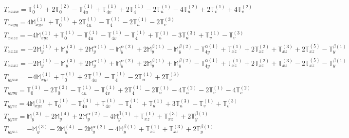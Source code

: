 \documentclass[fleqn,8pt,landscape]{jsarticle}
\begin{document}
\begin{align*}
& T_{xxxx} = \mathbb{T}_{0}^{(1)} + 2 \mathbb{T}_{0}^{(2)} - \mathbb{T}_{4u}^{(1)} + \mathbb{T}_{4v}^{(1)} + 2 \mathbb{T}_{4}^{(1)} - 2 \mathbb{T}_{u}^{(1)} - 4 \mathbb{T}_{u}^{(2)} + 2 \mathbb{T}_{v}^{(1)} + 4 \mathbb{T}_{v}^{(2)} \\
& T_{xxyy} = 4 \mathbb{M}_{xyz}^{(1)} + \mathbb{T}_{0}^{(1)} + 2 \mathbb{T}_{4u}^{(1)} - \mathbb{T}_{4}^{(1)} - 2 \mathbb{T}_{u}^{(1)} - 2 \mathbb{T}_{v}^{(3)} \\
& T_{xxzz} = - 4 \mathbb{M}_{xyz}^{(1)} + \mathbb{T}_{0}^{(1)} - \mathbb{T}_{4u}^{(1)} - \mathbb{T}_{4v}^{(1)} - \mathbb{T}_{4}^{(1)} + \mathbb{T}_{u}^{(1)} + 3 \mathbb{T}_{u}^{(3)} + \mathbb{T}_{v}^{(1)} - \mathbb{T}_{v}^{(3)} \\
& T_{xxzx} = - 2 \mathbb{M}_{y}^{(1)} + \mathbb{M}_{y}^{(3)} + 2 \mathbb{M}_{y}^{\alpha(1)} - \mathbb{M}_{y}^{\alpha(2)} + 2 \mathbb{M}_{y}^{\beta(1)} - \mathbb{M}_{y}^{\beta(2)} - \mathbb{T}_{4y}^{\alpha(1)} + \mathbb{T}_{xz}^{(1)} + 2 \mathbb{T}_{xz}^{(2)} + \mathbb{T}_{xz}^{(3)} + 2 \mathbb{T}_{xz}^{(5)} - \mathbb{T}_{y}^{\beta(1)} \\
& T_{xxxz} = - 2 \mathbb{M}_{y}^{(1)} - \mathbb{M}_{y}^{(3)} + 2 \mathbb{M}_{y}^{\alpha(1)} + \mathbb{M}_{y}^{\alpha(2)} + 2 \mathbb{M}_{y}^{\beta(1)} + \mathbb{M}_{y}^{\beta(2)} - \mathbb{T}_{4y}^{\alpha(1)} + \mathbb{T}_{xz}^{(1)} + 2 \mathbb{T}_{xz}^{(2)} + \mathbb{T}_{xz}^{(3)} - 2 \mathbb{T}_{xz}^{(5)} - \mathbb{T}_{y}^{\beta(1)} \\
& T_{yyxx} = - 4 \mathbb{M}_{xyz}^{(1)} + \mathbb{T}_{0}^{(1)} + 2 \mathbb{T}_{4u}^{(1)} - \mathbb{T}_{4}^{(1)} - 2 \mathbb{T}_{u}^{(1)} + 2 \mathbb{T}_{v}^{(3)} \\
& T_{yyyy} = \mathbb{T}_{0}^{(1)} + 2 \mathbb{T}_{0}^{(2)} - \mathbb{T}_{4u}^{(1)} - \mathbb{T}_{4v}^{(1)} + 2 \mathbb{T}_{4}^{(1)} - 2 \mathbb{T}_{u}^{(1)} - 4 \mathbb{T}_{u}^{(2)} - 2 \mathbb{T}_{v}^{(1)} - 4 \mathbb{T}_{v}^{(2)} \\
& T_{yyzz} = 4 \mathbb{M}_{xyz}^{(1)} + \mathbb{T}_{0}^{(1)} - \mathbb{T}_{4u}^{(1)} + \mathbb{T}_{4v}^{(1)} - \mathbb{T}_{4}^{(1)} + \mathbb{T}_{u}^{(1)} + 3 \mathbb{T}_{u}^{(3)} - \mathbb{T}_{v}^{(1)} + \mathbb{T}_{v}^{(3)} \\
& T_{yyzx} = \mathbb{M}_{y}^{(3)} + 2 \mathbb{M}_{y}^{(4)} + 2 \mathbb{M}_{y}^{\alpha(2)} - 4 \mathbb{M}_{y}^{\beta(1)} + \mathbb{T}_{xz}^{(1)} + \mathbb{T}_{xz}^{(3)} + 2 \mathbb{T}_{y}^{\beta(1)} \\
& T_{yyxz} = - \mathbb{M}_{y}^{(3)} - 2 \mathbb{M}_{y}^{(4)} - 2 \mathbb{M}_{y}^{\alpha(2)} - 4 \mathbb{M}_{y}^{\beta(1)} + \mathbb{T}_{xz}^{(1)} + \mathbb{T}_{xz}^{(3)} + 2 \mathbb{T}_{y}^{\beta(1)} \\

\end{align*}
\end{document}
